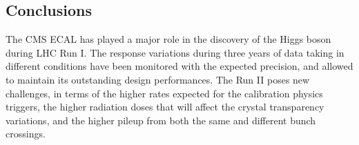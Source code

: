 \documentclass[11pt]{article}
\begin{document}
\begin{multicols}{2}
\section{Conclusions}
The CMS ECAL has played a major role in the discovery of the Higgs
boson during LHC Run I. The response variations during three years of
data taking in different conditions have been monitored with the
expected precision, and allowed to maintain its outstanding design
performances. The Run II poses new challenges, in terms of the higher
rates expected for the calibration physics triggers, the higher
radiation doses that will affect the crystal transparency variations,
and the higher pileup from both the same and different bunch
crossings.

\end{multicols}
\end{document}
